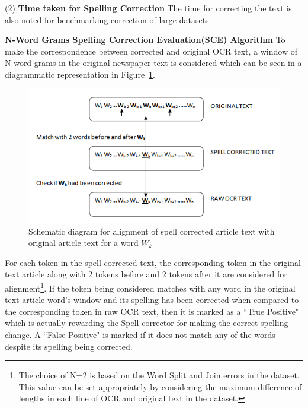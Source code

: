 \documentclass[preprint,11pt]{elsarticle}
\begin{document}
(2) \textbf{Time taken for Spelling Correction } The time for correcting the text is also noted for benchmarking correction of large datasets.


\noindent \textbf{N-Word Grams Spelling Correction Evaluation(SCE) Algorithm}
To make the correspondence between corrected and original OCR text, a window of N-word grams in the original newspaper text is considered which can be seen in a diagrammatic representation in Figure~\ref{figure:2}.
\begin{figure} [!htb]
\centering
\includegraphics[scale=0.8]{ngram}
\caption{Schematic diagram for alignment of spell corrected article text with original article text for a word $W_{k}$}
\label{figure:2}
\end{figure}
\noindent For each token in the spell corrected text, the corresponding token in the original text article along with 2 tokens before and 2 tokens after it are considered for alignment\footnote{ The choice of N=2 is based on the Word Split and Join errors in the dataset. This value can be set appropriately by considering the maximum difference of lengths in each line of OCR and original text in the dataset.}.
If the token being considered matches with any word in the original text article word's window and its spelling has been corrected when compared to the corresponding token in raw OCR text, then it is marked as a ``True Positive" which is actually rewarding the Spell corrector for making the correct spelling change. A ``False Positive" is marked if it does not match any of the words despite its spelling being corrected. 
\end{document}
